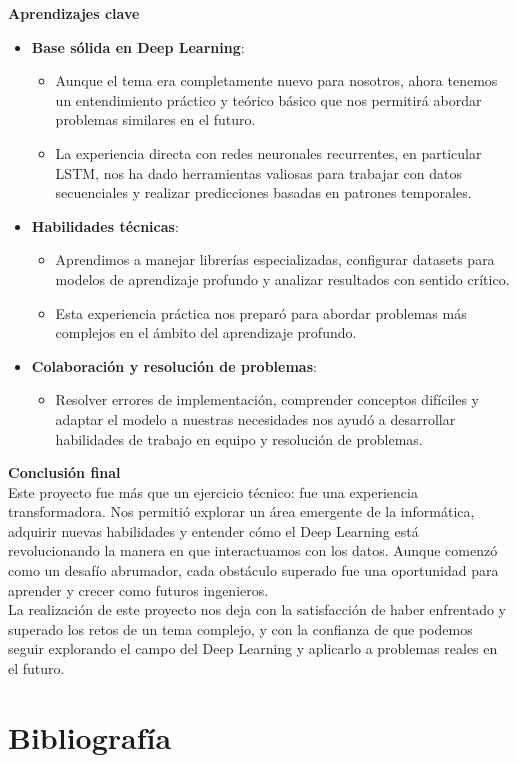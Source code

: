 \documentclass{article}
\begin{document}
{\Large{\textbf{Aprendizajes clave}}}
\begin{itemize}
    \item \textbf{Base sólida en Deep Learning}:
    \begin{itemize}
        \item Aunque el tema era completamente nuevo para nosotros, ahora tenemos un entendimiento práctico y teórico básico que nos permitirá abordar problemas similares en el futuro.
        \item La experiencia directa con redes neuronales recurrentes, en particular LSTM, nos ha dado herramientas valiosas para trabajar con datos secuenciales y realizar predicciones basadas en patrones temporales.
    \end{itemize}
    \item \textbf{Habilidades técnicas}:
    \begin{itemize}
        \item Aprendimos a manejar librerías especializadas, configurar datasets para modelos de aprendizaje profundo y analizar resultados con sentido crítico.
        \item Esta experiencia práctica nos preparó para abordar problemas más complejos en el ámbito del aprendizaje profundo.
    \end{itemize}
    \item \textbf{Colaboración y resolución de problemas}:
    \begin{itemize}
        \item Resolver errores de implementación, comprender conceptos difíciles y adaptar el modelo a nuestras necesidades nos ayudó a desarrollar habilidades de trabajo en equipo y resolución de problemas.
    \end{itemize}
\end{itemize}

{\Large{\textbf{Conclusión final}}} \\

Este proyecto fue más que un ejercicio técnico: fue una experiencia transformadora. Nos permitió explorar un área emergente de la informática, adquirir nuevas habilidades y entender cómo el Deep Learning está revolucionando la manera en que interactuamos con los datos. Aunque comenzó como un desafío abrumador, cada obstáculo superado fue una oportunidad para aprender y crecer como futuros ingenieros. \\

La realización de este proyecto nos deja con la satisfacción de haber enfrentado y superado los retos de un tema complejo, y con la confianza de que podemos seguir explorando el campo del Deep Learning y aplicarlo a problemas reales en el futuro.

\newpage

\section{Bibliografía}
\nocite{*}
\printbibliography
\end{document}
